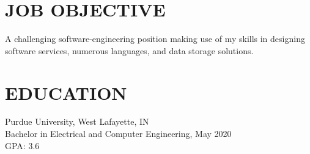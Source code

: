 \documentclass[10pt]{res}
\begin{document}
 
\vspace{-30pt}

\address{\bf ADDRESS\\ 14977 Montclair Drive \\ Westfield, IN, 46074} 
\address{\bf CONTACT\\ (317) 363-7700 \\ joseph@gerardot.org/indyjag@gmail.com } 
                                  
\begin{resume}

\vspace{-10pt}\section{JOB OBJECTIVE}          
	A challenging software-engineering position making use of my skills in designing software services,
	numerous languages, and data storage solutions. 
\vspace{-10pt}\section{EDUCATION}          
    Purdue University, West Lafayette, IN \\ 
    Bachelor in Electrical and Computer Engineering, May 2020   \\       
	GPA: 3.6 \\
 

\end{resume}
\end{document}
